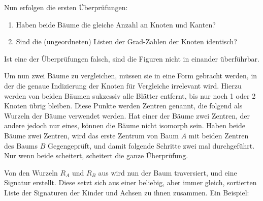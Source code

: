 \documentclass[a4paper,10pt,ngerman]{scrartcl}
\begin{document}
    Nun erfolgen die ersten Überprüfungen:
    \begin{enumerate}
        \item Haben beide Bäume die gleiche Anzahl an Knoten und Kanten?
        \item Sind die (ungeordneten) Listen der Grad-Zahlen der Knoten identisch?
    \end{enumerate}
    Ist eine der Überprüfungen falsch, sind die Figuren nicht in einander überführbar.

    Um nun zwei Bäume zu vergleichen, müssen sie in eine Form gebracht werden, in der die genaue Indizierung der Knoten
    für Vergleiche irrelevant wird. Hierzu werden von beiden Bäumen sukzessiv alle Blätter entfernt, bis nur noch 1
    oder 2 Knoten übrig bleiben. Diese Punkte werden Zentren genannt, die folgend als Wurzeln der Bäume verwendet
    werden. Hat einer der Bäume zwei Zentren, der andere jedoch nur eines, können die Bäume nicht isomorph sein.
    Haben beide Bäume zwei Zentren, wird das erste Zentrum von Baum $A$ mit beiden Zentren des Baums $B$ Gegengeprüft,
    und damit folgende Schritte zwei mal durchgeführt. Nur wenn beide scheitert, scheitert die ganze Überprüfung.

    Von den Wurzeln $R_A$ und $R_B$ aus wird nun der Baum traversiert, und eine Signatur erstellt. Diese setzt sich aus
    einer beliebig, aber immer gleich, sortierten Liste der Signaturen der Kinder und Achsen zu ihnen zusammen.
    Ein Beispiel:
\end{document}
